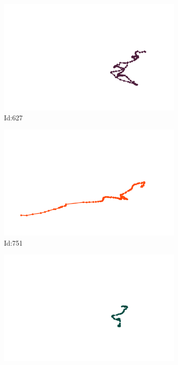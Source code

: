 \documentclass[12pt,twoside]{report}
\begin{document}
\begin{figure}
\centering
\begin{subfigure}[b]{0.20\textwidth}
\centering
\includegraphics[width=\textwidth]{../../trajectories/627.png}
\caption{Id:627}
\end{subfigure}
\begin{subfigure}[b]{0.20\textwidth}
\centering
\includegraphics[width=\textwidth]{../../trajectories/751.png}
\caption{Id:751}
\end{subfigure}
\begin{subfigure}[b]{0.20\textwidth}
\centering
\includegraphics[width=\textwidth]{../../trajectories/804.png}

\end{subfigure}
\end{figure}
\end{document}
